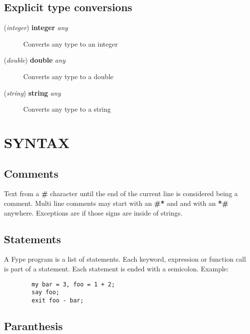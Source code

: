 \subsection*{Explicit type conversions\label{Explicit_type_conversions}}
\begin{description}

\item[{(\textit{integer}) \textbf{integer} \textit{any}}] \mbox{}

Converts any type to an integer


\item[{(\textit{double}) \textbf{double} \textit{any}}] \mbox{}

Converts any type to a double


\item[{(\textit{string}) \textbf{string} \textit{any}}] \mbox{}

Converts any type to a string

\end{description}
\section{SYNTAX\label{SYNTAX}}
\subsection*{Comments\label{Comments}}


Text from a \textbf{\#} character until the end of the current line is considered being a comment. Multi line comments may start with an \textbf{\#*} and and with an \textbf{*\#} anywhere. Exceptions are if those signs are inside of strings.

\subsection*{Statements\label{Statements}}


A Fype program is a list of statements. Each keyword, expression or function call is part of a statement. Each statement is ended with a semicolon. Example:

\begin{verbatim}
        my bar = 3, foo = 1 + 2; 
        say foo;
        exit foo - bar;
\end{verbatim}
\subsection*{Paranthesis\label{Paranthesis}}



